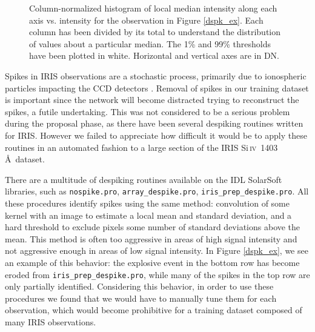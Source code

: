 \documentclass[10pt,letterpaper, doublespace]{article}
\newcommand{\SiIV}{Si\,\textsc{iv}~1403\,\AA}
\begin{document}
\begin{figure}[h!]
				\caption{Column-normalized histogram of local median intensity along each axis vs. intensity for the observation in Figure \ref{dspk_ex}.
					Each column has been divided by its total to understand the distribution of values about a particular median.
					The 1\% and 99\% thresholds have been plotted in white.
					Horizontal and vertical axes are in DN.}
				
				\label{dspk_hist}
				
			\end{figure}
			
			Spikes in IRIS observations are a stochastic process, primarily due to ionospheric particles impacting the CCD detectors \citep{itn15}.
			Removal of spikes in our training dataset is important since the network will become distracted trying to reconstruct the spikes, a futile undertaking.
			This was not considered to be a serious problem during the proposal phase, as there have been several despiking routines written for IRIS.
			However we failed to appreciate how difficult it would be to apply these routines in an automated fashion to a large section of the IRIS \SiIV\ dataset.
			
			There are a multitude of despiking routines available on the IDL SolarSoft libraries, such as \texttt{nospike.pro}, \texttt{array\_despike.pro}, \texttt{iris\_prep\_despike.pro}.
			All these procedures identify spikes using the same method: convolution of some kernel with an image to estimate a local mean and standard deviation, and a hard threshold to exclude pixels some number of standard deviations above the mean.
			This method is often too aggressive in areas of high signal intensity and not aggressive enough in areas of low signal intensity.
			In Figure \ref{dspk_ex}, we see an example of this behavior: the explosive event in the bottom row has become eroded from \texttt{iris\_prep\_despike.pro}, while many of the spikes in the top row are only partially identified.
			Considering this behavior, in order to use these procedures we found that we would have to manually tune them for each observation, which would become prohibitive for a training dataset composed of many IRIS observations.
			
\end{document}
